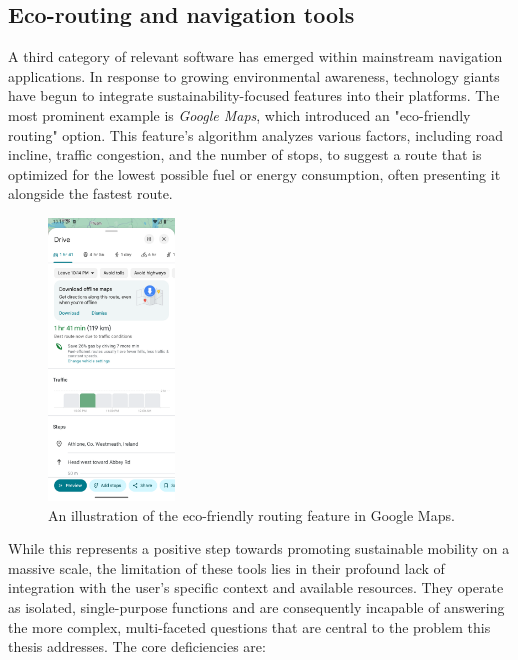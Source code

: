 \subsection{Eco-routing and navigation tools}
A third category of relevant software has emerged within mainstream navigation applications. In response to growing environmental awareness, technology giants have begun to integrate sustainability-focused features into their platforms. The most prominent example is \textit{Google Maps}, which introduced an "eco-friendly routing" option. This feature's algorithm analyzes various factors, including road incline, traffic congestion, and the number of stops, to suggest a route that is optimized for the lowest possible fuel or energy consumption, often presenting it alongside the fastest route.

\begin{figure}[H]
    \centering
    \includegraphics[width=0.3\textwidth]{images/background/google-maps-ecorouting.png}
    \caption{An illustration of the eco-friendly routing feature in Google Maps.}
\end{figure}

\textgap

While this represents a positive step towards promoting sustainable mobility on a massive scale, the limitation of these tools lies in their profound lack of integration with the user's specific context and available resources. They operate as isolated, single-purpose functions and are consequently incapable of answering the more complex, multi-faceted questions that are central to the problem this thesis addresses. The core deficiencies are:

